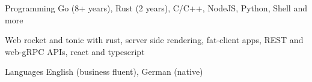 


\begin{cvskills}


\cvskill
{Programming} %
{Go (8+ years), Rust (2 years), C/C++, NodeJS, Python, Shell and more} %


\cvskill
{Web} %
{rocket and tonic with rust, server side rendering, fat-client apps, REST and web-gRPC APIs, react and typescript} %


\cvskill
{Languages} %
{English (business fluent), German (native)} %


\end{cvskills}